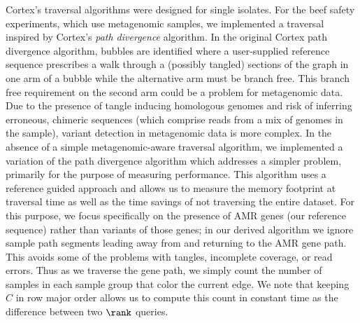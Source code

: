 {\sc Cortex}'s traversal algorithms were designed for single isolates. For the beef safety experiments, which use metagenomic samples, we implemented a traversal inspired by {\sc Cortex}'s {\it path divergence} algorithm.  In the original {\sc Cortex} path divergence algorithm, bubbles are identified where a user-supplied reference sequence prescribes a walk through a (possibly tangled) sections of the graph in one arm of a bubble while the alternative arm must be branch free.  This branch free requirement on the second arm could be a problem for metagenomic data. Due to the presence of tangle inducing homologous genomes and risk of inferring erroneous, chimeric sequences (which comprise reads from a mix of genomes in the sample), variant detection in metagenomic data is more complex. %
In the absence of a simple metagenomic-aware traversal algorithm, we implemented a variation of the path divergence algorithm which addresses a simpler problem, primarily for the purpose of measuring performance.  This algorithm uses a reference guided approach and allows us to measure the memory footprint at traversal time as well as the time savings of not traversing the entire dataset.  For this purpose, we focus specifically on the presence of AMR genes (our reference sequence) rather than variants of those genes; in our derived algorithm we ignore sample path segments leading away from and returning to the AMR gene path.  This avoids some of the problems with tangles, incomplete coverage, or read errors.  Thus as we traverse the gene path, we simply count the number of samples in each sample group that color the current edge.   We note that keeping $C$ in row major order allows us to compute this count in constant time as the difference between two $\rank$ queries.  










